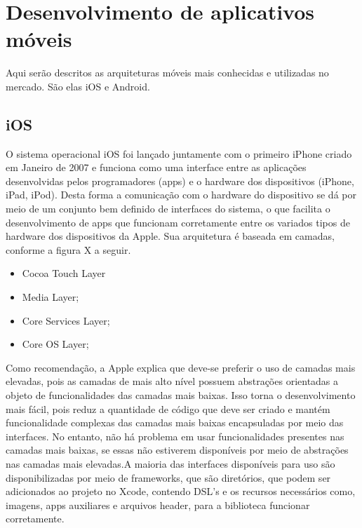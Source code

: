 \chapter{Desenvolvimento de aplicativos móveis}\label{referencialteorico}

Aqui serão descritos as arquiteturas móveis mais conhecidas e utilizadas no mercado. São elas iOS e Android.

\section{iOS}

O sistema operacional iOS foi lançado juntamente com o primeiro iPhone criado em Janeiro de 2007 e 
funciona como uma interface entre as aplicações desenvolvidas pelos programadores (apps) e o hardware 
dos dispositivos (iPhone, iPad, iPod). Desta forma a comunicação com o hardware do dispositivo se dá 
por meio de um conjunto bem definido de interfaces do sistema, o que facilita o desenvolvimento de apps 
que funcionam corretamente entre os variados tipos de hardware dos dispositivos da Apple. Sua arquitetura 
é baseada em camadas, conforme a figura X a seguir.
 
\begin{itemize}

	\item Cocoa Touch Layer
	\item Media Layer;
	\item Core Services Layer;
	\item Core OS Layer;

\end{itemize}

Como recomendação, a Apple explica que deve-se preferir o uso de camadas mais elevadas, pois as camadas de 
mais alto nível possuem abstrações orientadas a objeto de funcionalidades das camadas mais baixas. Isso 
torna o desenvolvimento mais fácil, pois reduz a quantidade de código que deve ser criado e mantém funcionalidade 
complexas das camadas mais baixas encapsuladas por meio das interfaces. No entanto, não há problema em usar 
funcionalidades presentes nas camadas mais baixas, se essas não estiverem disponíveis por meio de abstrações nas 
camadas mais elevadas.A maioria das interfaces disponíveis para uso são disponibilizadas por meio de frameworks, 
que são diretórios, que podem ser adicionados ao projeto no Xcode, contendo DSL's e os recursos necessários como, 
imagens, apps auxiliares e arquivos header, para a biblioteca funcionar corretamente.

